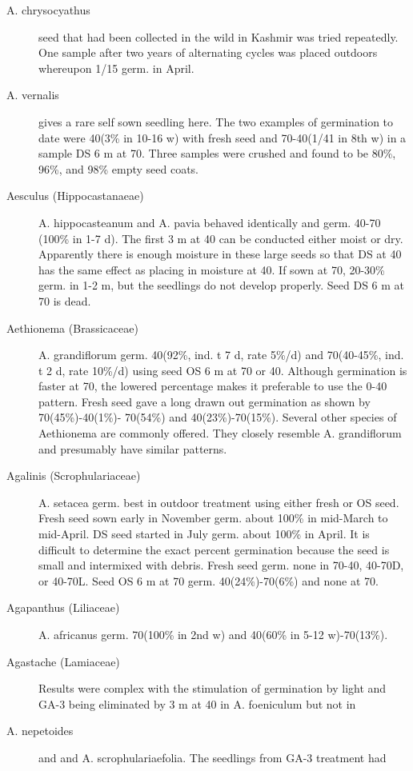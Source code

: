 \begin{description}
\item[A. chrysocyathus] seed that had been collected in the wild in Kashmir was tried
repeatedly. One sample after two years of alternating cycles was placed outdoors
whereupon 1/15 germ. in April.

\item[A. vernalis] gives a rare self sown seedling here. The two examples of
germination to date were 40(3\% in 10-16 w) with fresh seed and 70-40(1/41 in 8th w)
in a sample DS 6 m at 70. Three samples were crushed and found to be 80\%, 96\%,
and 98\% empty seed coats.

\item[Aesculus (Hippocastanaeae)] A. hippocasteanum and A. pavia behaved
identically and germ. 40-70 (100\% in 1-7 d). The first 3 m at 40 can be conducted
either moist or dry. Apparently there is enough moisture in these large seeds so that
DS at 40 has the same effect as placing in moisture at 40. If sown at 70, 20-30\% germ.
in 1-2 m, but the seedlings do not develop properly. Seed DS 6 m at 70 is dead.
\item[Aethionema (Brassicaceae)] A. grandiflorum germ. 40(92\%, ind. t 7 d, rate
5\%/d) and 70(40-45\%, ind. t 2 d, rate 10\%/d) using seed OS 6 m at 70 or 40. Although
germination is faster at 70, the lowered percentage makes it preferable to use the 0-40
pattern. Fresh seed gave a long drawn out germination as shown by 70(45\%)-40(1\%)-
70(54\%) and 40(23\%)-70(15\%). Several other species of Aethionema are commonly
offered. They closely resemble A. grandiflorum and presumably have similar patterns.
\item[Agalinis (Scrophulariaceae)] A. setacea germ. best in outdoor treatment
using either fresh or OS seed. Fresh seed sown early in November germ. about 100\%
in mid-March to mid-April. DS seed started in July germ. about 100\% in April. It is
difficult to determine the exact percent germination because the seed is small and
intermixed with debris. Fresh seed germ. none in 70-40, 40-70D, or 40-70L. Seed OS
6 m at 70 germ. 40(24\%)-70(6\%) and none at 70.
\item[Agapanthus (Liliaceae)] A. africanus germ. 70(100\% in 2nd w) and
40(60\% in 5-12 w)-70(13\%).
\item[Agastache (Lamiaceae)] Results were complex with the stimulation of
germination by light and GA-3 being eliminated by 3 m at 40 in A. foeniculum but not in
\item[A. nepetoides] and and A. scrophulariaefolia. The seedlings from GA-3 treatment had

\end{description}
